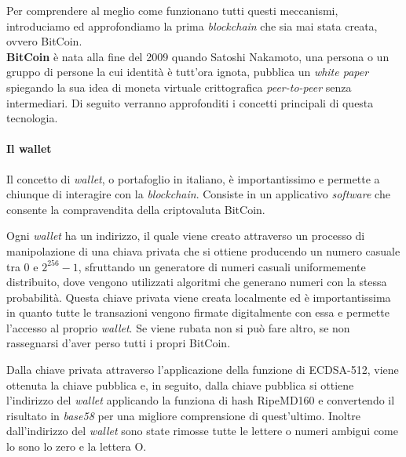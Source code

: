 Per comprendere al meglio come funzionano tutti questi meccanismi, introduciamo ed approfondiamo la prima \textit{blockchain} che sia mai stata creata, ovvero BitCoin. \\

\textbf{BitCoin} è nata alla fine del 2009 quando Satoshi Nakamoto, una persona o un gruppo di persone la cui identità è tutt'ora ignota, pubblica un \textit{white paper} spiegando la sua idea di moneta virtuale crittografica \textit{peer-to-peer} senza intermediari. Di seguito verranno approfonditi i concetti principali di questa tecnologia.


\paragraph{Il wallet}
Il concetto di \textit{wallet}, o portafoglio in italiano, è importantissimo e permette a chiunque di interagire con la \textit{blockchain}. Consiste in un applicativo \textit{software} che consente la compravendita della criptovaluta BitCoin.


Ogni \textit{wallet} ha un indirizzo, il quale viene creato attraverso un processo di manipolazione di una chiava privata che si ottiene producendo un numero casuale tra \( 0 \) e \( 2^{256}-1 \), sfruttando un generatore di numeri casuali uniformemente distribuito, dove vengono utilizzati algoritmi che generano numeri con la stessa probabilità. Questa chiave privata viene creata localmente ed è importantissima in quanto tutte le transazioni vengono firmate digitalmente con essa e permette l'accesso al proprio \textit{wallet}. Se viene rubata non si può fare altro, se non rassegnarsi d'aver perso tutti i propri BitCoin.

Dalla chiave privata attraverso l'applicazione della funzione di ECDSA-512, viene ottenuta la chiave pubblica e, in seguito, dalla chiave pubblica si ottiene l'indirizzo del \textit{wallet} applicando la funziona di hash RipeMD160 e convertendo il risultato in \textit{base58} per una migliore comprensione di quest'ultimo. Inoltre dall'indirizzo del \textit{wallet} sono state rimosse tutte le lettere o numeri ambigui come lo sono lo zero e la lettera O.

